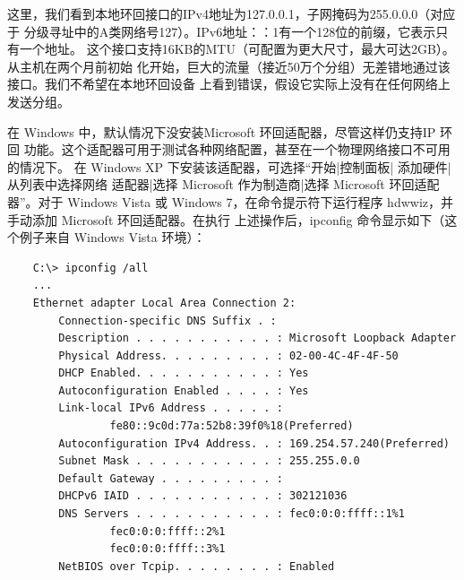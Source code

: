这里，我们看到本地环回接口的IPv4地址为127.0.0.1，子网掩码为255.0.0.0（对应于
分级寻址中的A类网络号127）。IPv6地址：：1有一个128位的前缀，它表示只有一个地址。
这个接口支持16KB的MTU（可配置为更大尺寸，最大可达2GB）。从主机在两个月前初始
化开始，巨大的流量（接近50万个分组）无差错地通过该接口。我们不希望在本地环回设备
上看到错误，假设它实际上没有在任何网络上发送分组。

在 Windows 中，默认情况下没安装Microsoft 环回适配器，尽管这样仍支持IP 环回
功能。这个适配器可用于测试各种网络配置，甚至在一个物理网络接口不可用的情况下。
在 Windows XP 下安装该适配器，可选择“开始|控制面板| 添加硬件| 从列表中选择网络
适配器|选择 Microsoft 作为制造商|选择 Microsoft 环回适配器”。对于 Windows Vista 或
Windows 7，在命令提示符下运行程序 hdwwiz，并手动添加 Microsoft 环回适配器。在执行
上述操作后，ipconfig 命令显示如下（这个例子来自 Windows Vista 环境）：

\begin{verbatim}
    C:\> ipconfig /all
    ...
    Ethernet adapter Local Area Connection 2:
        Connection-specific DNS Suffix . :
        Description . . . . . . . . . . . : Microsoft Loopback Adapter
        Physical Address. . . . . . . . . : 02-00-4C-4F-4F-50
        DHCP Enabled. . . . . . . . . . . : Yes
        Autoconfiguration Enabled . . . . : Yes
        Link-local IPv6 Address . . . . . :
                fe80::9c0d:77a:52b8:39f0%18(Preferred)
        Autoconfiguration IPv4 Address. . : 169.254.57.240(Preferred)
        Subnet Mask . . . . . . . . . . . : 255.255.0.0
        Default Gateway . . . . . . . . . :
        DHCPv6 IAID . . . . . . . . . . . : 302121036
        DNS Servers . . . . . . . . . . . : fec0:0:0:ffff::1%1
                fec0:0:0:ffff::2%1
                fec0:0:0:ffff::3%1
        NetBIOS over Tcpip. . . . . . . . : Enabled
\end{verbatim}

